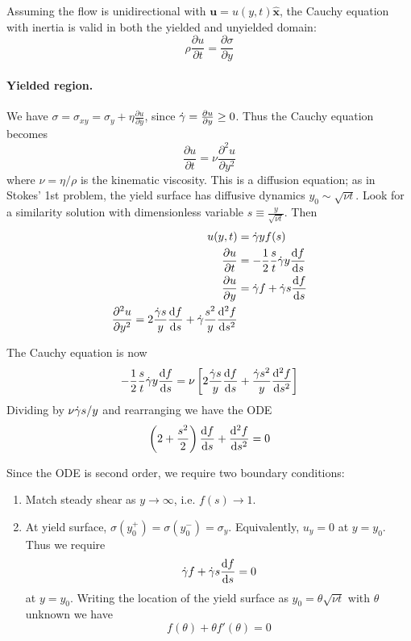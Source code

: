 \documentclass{jknotes}
\begin{document}
Assuming the flow is unidirectional with $\symbf{u} = u(y,t)\hat{\symbf{x}}$, the Cauchy
equation with inertia is valid in both the yielded and unyielded domain:
\begin{equation}
	\rho \frac{\partial u}{\partial t} = \frac{\partial \sigma}{\partial y}
\end{equation}

\paragraph{Yielded region.} We have $\sigma = \sigma_{xy} = \sigma_y + \eta
\frac{\partial u}{\partial y}$, since $\dot{\gamma} = \frac{\partial u}{\partial y}
\ge 0$. Thus the Cauchy equation becomes
\begin{equation}
	\frac{\partial u}{\partial t} = \nu \frac{\partial^2 u}{\partial y^2}
\end{equation}
where $\nu = \eta/\rho$ is the kinematic viscosity. This is a diffusion
equation; as in Stokes' 1st problem, the yield surface has diffusive dynamics
$y_0 \sim \sqrt{\nu t}$. Look for a similarity solution with dimensionless
variable $s \equiv \frac{y}{\sqrt{\nu t}}$. Then
\begin{align}
	u(y,t) &= \srate y f(s)\\
	\frac{\partial u}{\partial t} &= -\frac{1}{2}\frac{s}{t} \srate y
	\frac{\diffd f}{\diffd s} \\
	\frac{\partial u}{\partial y} &= \srate f + \srate s \frac{\diffd
	f}{\diffd s} \\
	\frac{\partial^2 u}{\partial y^2} = 2 \frac{\srate s}{y} \frac{\diffd
	f}{\diffd s} + \srate \frac{s^2}{y}\frac{\diffd^2 f}{\diffd s^2}
\end{align}

The Cauchy equation is now
\begin{equation}
	-\frac{1}{2}\frac{s}{t}\srate y \frac{\diffd f}{\diffd s} = \nu \left[ 2
		\frac{\srate s}{y} \frac{\diffd f}{\diffd s} + \frac{\srate s^2}{y}
	\frac{\diffd^2 f}{\diffd s^2} \right] 
\end{equation}
Dividing by $\nu \dot{\gamma} s/ y$ and rearranging we have the ODE
\begin{equation}
	\left( 2+ \frac{s^2}{2}\right) \frac{\diffd f}{\diffd s} + \frac{\diffd^2
	f}{\diffd s^2} = 0
\end{equation}

Since the ODE is second order, we require two boundary conditions:
\begin{enumerate}
	\item Match steady shear as $y \to \infty$, i.e. $f(s) \to 1$.
	\item At yield surface, $\sigma(y_0^+) = \sigma(y_0^-) = \sigma_y$.
		Equivalently, $u_y = 0$ at $y = y_0$. Thus we require
		\begin{equation}
			\srate f + \srate s \frac{\diffd f}{\diffd s } = 0
		\end{equation}
		at $y = y_0$. Writing the location of the yield surface as $y_0 =
		\theta \sqrt{\nu t}$ with $\theta$ unknown we have
		\begin{equation}
			f(\theta) + \theta f'(\theta) = 0
		\end{equation}
\end{enumerate}
\end{document}
